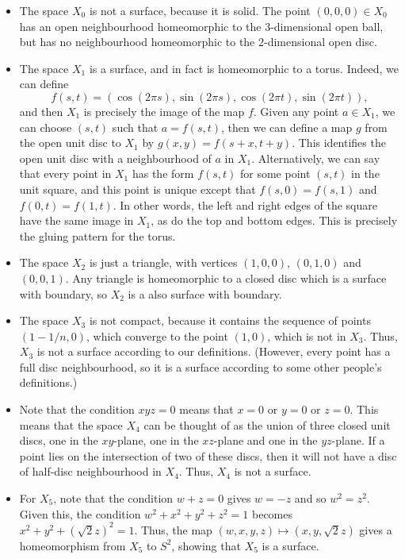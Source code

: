 \documentclass[a4paper]{amsart}
\begin{document}
\begin{solution}
 \begin{itemize}
  \item The space $X_0$ is not a surface, because it is solid.  The point
   $(0,0,0)\in X_0$ has an open neighbourhood homeomorphic to the
   $3$-dimensional open ball, but has no neighbourhood homeomorphic to
   the $2$-dimensional open disc.
  \item The space $X_1$ is a surface, and in fact is homeomorphic to a torus.
   Indeed, we can define 
   \[ f(s,t)=(\cos(2\pi s),\sin(2\pi s),\cos(2\pi t),\sin(2\pi t)), \]
   and then $X_1$ is precisely the image of the map $f$.  Given any
   point $a\in X_1$, we can choose $(s,t)$ such that $a=f(s,t)$, then
   we can define a map $g$ from the open unit disc to $X_1$ by
   $g(x,y)=f(s+x,t+y)$.  This identifies the open unit disc with a
   neighbourhood of $a$ in $X_1$.  Alternatively, we can say that
   every point in $X_1$ has the form $f(s,t)$ for some point $(s,t)$
   in the unit square, and this point is unique except that
   $f(s,0)=f(s,1)$ and $f(0,t)=f(1,t)$.  In other words, the left and
   right edges of the square have the same image in $X_1$, as do the
   top and bottom edges.  This is precisely the gluing pattern for the
   torus.
  \item The space $X_2$ is just a triangle, with vertices $(1,0,0)$,
   $(0,1,0)$ and $(0,0,1)$.  Any triangle is homeomorphic to a closed
   disc which is a surface with boundary, so $X_2$ is a also surface
   with boundary.
  \item The space $X_3$ is not compact, because it contains the
   sequence of points $(1-1/n,0)$, which converge to the point
   $(1,0)$, which is not in $X_3$.  Thus, $X_3$ is not a surface
   according to our definitions.  (However, every point has a full
   disc neighbourhood, so it is a surface according to some other
   people's definitions.)
  \item Note that the condition $xyz=0$ means that $x=0$ or $y=0$ or
   $z=0$.  This means that the space $X_4$ can be thought of as the
   union of three closed unit discs, one in the $xy$-plane, one in the
   $xz$-plane and one in the $yz$-plane.  If a point lies on the
   intersection of two of these discs, then it will not have a disc of
   half-disc neighbourhood in $X_4$.  Thus, $X_4$ is not a surface.
  \item For $X_5$, note that the condition $w+z=0$ gives $w=-z$ and so
   $w^2=z^2$.  Given this, the condition $w^2+x^2+y^2+z^2=1$ becomes
   $x^2+y^2+(\sqrt{2}z)^2=1$.  Thus, the map
   $(w,x,y,z)\mapsto(x,y,\sqrt{2}z)$ gives a homeomorphism from $X_5$
   to $S^2$, showing that $X_5$ is a surface.
 \end{itemize}
\end{solution}
\end{document}
